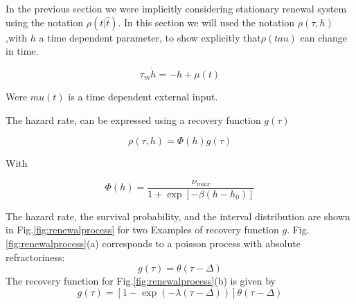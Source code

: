 \documentclass{report}
\begin{document}
In the previous section we were implicitly considering stationary renewal system using the notation $\rho(t|\hat{t})$. In this section we will used the notation $\rho(\tau,h)$,with $h$ a time dependent parameter, to show explicitly that$\rho(tau)$ can change in time.


\begin{equation}
  \label{eq:hi}
  \tau_m\dot h=-h+\mu(t)
\end{equation}



Were $mu(t)$ is a time dependent external input.

The hazard rate, can be expressed using a recovery function $g(\tau)$

\begin{equation}
\label{eq:rho}
\rho(\tau,h)=\Phi(h)g(\tau)
\end{equation}

With 

\begin{equation}
\label{eq:phi}
\Phi(h)=\frac{\nu_{max}}{1+\exp[-\beta(h-h_0)]}
\end{equation}

The hazard rate, the survival probability, and the interval distribution are shown in Fig.\ref{fig:renewalprocess} for two Examples of recovery function $g$. Fig.\ref{fig:renewalprocess}(a) corresponds to a poisson process with absolute refractoriness: 
\begin{equation}
\label{eq:poissonabs}
g(\tau)=\theta(\tau-\Delta)
\end{equation}
 The recovery function for Fig.\ref{fig:renewalprocess}(b) is given by
\begin{equation}
\label{eq:expabs}
  g(\tau)=\left[1-\exp(-\lambda(\tau-\Delta))\right]\theta(\tau-\Delta)
\end{equation}
\end{document}
